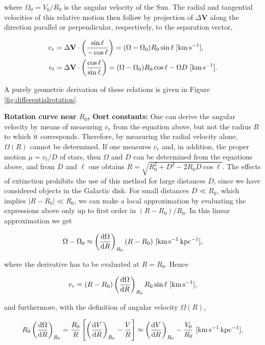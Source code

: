\documentclass[a4paper,10pt]{article}
\begin{document}
{\noindent}where $\Omega_0=V_0/R_0$ is the angular velocity of the Sun. The radial and tangential velocities of this relative motion then follow by projection of $\Delta\mathbf{V}$ along the direction parallel or perpendicular, respectively, to the separation vector,

\begin{align*}
    v_r &= \Delta\mathbf{V}\cdot\left(\frac{\sin\ell}{-\cos\ell}\right) = (\Omega-\Omega_0)R_0\sin\ell ~ [{\rm km\,s^{-1}}], \\
    v_t &= \Delta\mathbf{V}\cdot\left(\frac{\cos\ell}{\sin\ell}\right) = (\Omega-\Omega_0)R_0\cos\ell - \Omega D ~ [{\rm km\,s^{-1}}].
\end{align*}

{\noindent}A purely geometric derivation of these relations is given in Figure \ref{fig:differentialrotation}.

{\noindent}\textbf{Rotation curve near $R_0$, Oort constants:} One can derive the angular velocity by means of measuring $v_r$ from the equation above, but not the radius $R$ to which it corresponds. Therefore, by measuring the radial velocity alone, $\Omega(R)$ cannot be determined. If one measures $v_r$ and, in addition, the proper motion $\mu=v_t/D$ of stars, then $\Omega$ and $D$ can be determined from the equations above, and from $D$ and $\ell$ one obtains $R=\sqrt{R_0^2+D^2-2R_0D\cos\ell}$. The effects of extinction prohibits the use of this method for large distances $D$, since we have considered objects in the Galactic disk. For small distances $D\ll R_0$, which implies $\lvert R-R_0\rvert\ll R_0$, we can make a local approximation by evaluating the expressions above only up to first order in $(R-R_0)/R_0$. In this linear approximation we get

\begin{align*}
    \Omega-\Omega_0\approx \left(\frac{{\rm d}\Omega}{{\rm d}R}\right)_{R_0} (R-R_0) ~ [{\rm km\,s^{-1}\,kpc^{-1}}],
\end{align*}

{\noindent}where the derivative has to be evaluated at $R=R_0$. Hence

\begin{align*}
    v_r = (R-R_0) \left(\frac{{\rm d}\Omega}{{\rm d}R}\right)_{R_0} R_0\sin\ell ~ [{\rm km\,s^{-1}}],
\end{align*}

{\noindent}and furthermore, with the definition of angular velocity $\Omega(R)$,

\begin{align*}
    R_0\left(\frac{{\rm d}\Omega}{{\rm d}R}\right)_{R_0} = \frac{R_0}{R} \left[\left(\frac{{\rm d}V}{{\rm d}R}\right)_{R_0} - \frac{V}{R}\right] \approx \left(\frac{{\rm d}V}{{\rm d}R}\right)_{R_0} - \frac{V_0}{R_0} ~ [{\rm km\,s^{-1}\,kpc^{-1}}],
\end{align*}
\end{document}
